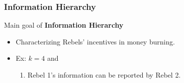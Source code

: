 \documentclass[10pt]{beamer}
\begin{document}
\begin{frame}
   \frametitle{Information Hierarchy}


Main goal of \textbf{Information Hierarchy}
\begin{itemize}
\item Characterizing Rebels' incentives in money burning.
\item Ex: $k=4$ and
\begin{center}
\end{center}

\begin{enumerate}
\item Rebel 1's information can be reported by Rebel 2.
\end{enumerate}

\end{itemize}



\end{frame}
\end{document}
